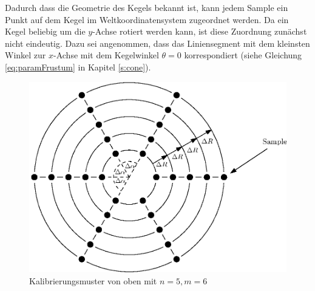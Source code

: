 Dadurch dass die Geometrie des Kegels bekannt ist, kann jedem Sample ein Punkt auf dem Kegel im Weltkoordinatensystem zugeordnet werden. Da ein Kegel beliebig um die $y$-Achse rotiert werden kann, ist diese Zuordnung zunächst nicht eindeutig. Dazu sei angenommen, dass das Liniensegment mit dem kleinsten Winkel zur $x$-Achse mit dem Kegelwinkel $\theta = 0$ korrespondiert (siehe Gleichung \ref{eq:paramFrustum} in Kapitel \ref{s:cone}).

\begin{figure}[!htb]
	\centering
	\includegraphics[scale=.8]{images/calibrationPatternTop.eps}
	\caption{Kalibrierungsmuster von oben mit $n = 5, m = 6$}
	\label{fig:calibrationPatternTop}
\end{figure}


